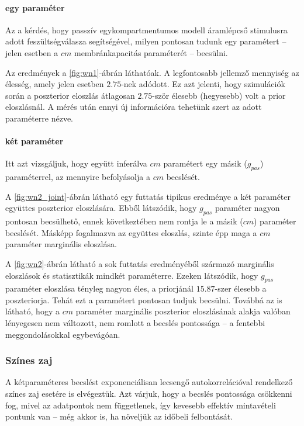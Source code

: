 \paragraph{egy paraméter}
Az a kérdés, hogy passzív egykompartmentumos modell áramlépcső stimulusra adott feszültségválasza segítségével, milyen pontosan tudunk egy paramétert -- jelen esetben a $cm$ membránkapacitás paraméterét -- becsülni.

Az eredmények a \ref{fig:wn1}-ábrán láthatóak. A legfontosabb jellemző mennyiség az élesség, amely jelen esetben $2.75$-nek adódott. Ez azt jelenti, hogy szimulációk során a poszterior eloszlás átlagosan $2.75$-ször élesebb (hegyesebb) volt a prior eloszlásnál. A mérés után ennyi új információra tehetünk szert az adott paraméterre nézve.


\paragraph{két paraméter}
Itt azt vizsgáljuk, hogy együtt inferálva $cm$ paramétert egy másik ($g_{pas}$) paraméterrel, az mennyire befolyásolja a $cm$ becslését.

A \ref{fig:wn2_joint}-ábrán látható egy futtatás tipikus eredménye a két paraméter együttes poszterior eloszlására. Ebből látszódik, hogy $g_{pas}$ paraméter nagyon pontosan becsülhető, ennek következtében nem rontja le a másik ($cm$) paraméter becslését. Másképp fogalmazva az együttes eloszlás, szinte épp maga a $cm$ paraméter marginális eloszlása. 


A \ref{fig:wn2}-ábrán látható a sok futtatás eredményéből származó marginális eloszlások és statisztikák mindkét paraméterre. Ezeken látszódik, hogy $g_{pas}$ paraméter eloszlása tényleg nagyon éles, a priorjánál $15.87$-szer élesebb a poszteriorja. Tehát ezt a paramétert pontosan tudjuk becsülni. Továbbá az is látható, hogy a $cm$ paraméter marginális poszterior eloszlásának alakja valóban lényegesen nem változott, nem romlott a becslés pontossága -- a fentebbi meggondolásokkal egybevágóan.

\subsubsection{Színes zaj}
A kétparaméteres becslést exponenciálisan lecsengő autokorrelációval rendelkező színes zaj esetére is elvégeztük. Azt várjuk, hogy a becslés pontossága csökkenni fog, mivel az adatpontok nem függetlenek, így kevesebb effektív mintavételi pontunk van -- még akkor is, ha növeljük az időbeli felbontását.

